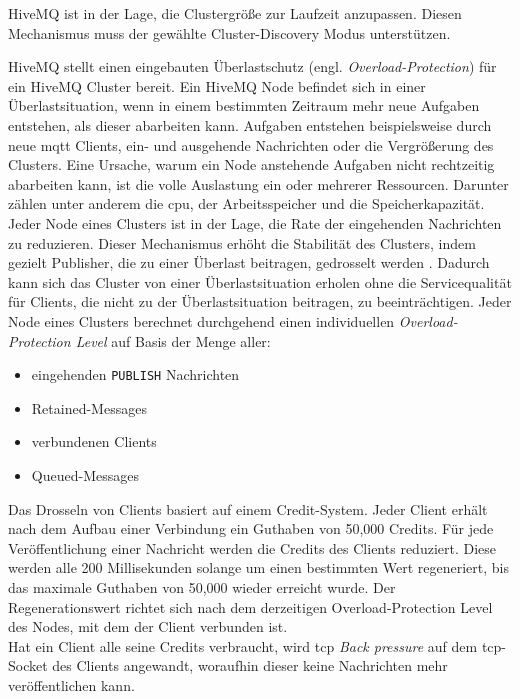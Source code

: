HiveMQ ist in der Lage, die Clustergrö{\ss}e zur Laufzeit anzupassen. Diesen Mechanismus muss der gewählte Cluster-Discovery Modus unterstützen.
\cite{HiveMQClusterHiveMQ}

 \label{sb:overload-protection}
HiveMQ stellt einen eingebauten Überlastschutz (engl. \textit{Overload-Protection}) für ein HiveMQ Cluster bereit.
Ein HiveMQ Node befindet sich in einer Überlastsituation, wenn in einem bestimmten Zeitraum mehr neue Aufgaben entstehen, als dieser abarbeiten kann. Aufgaben entstehen beispielsweise durch neue \ac{mqtt} Clients, ein- und ausgehende Nachrichten oder die Vergrö{\ss}erung des Clusters.
Eine Ursache, warum ein Node anstehende Aufgaben nicht rechtzeitig abarbeiten kann, ist die volle Auslastung ein oder mehrerer Ressourcen. Darunter zählen unter anderem die \ac{cpu}, der Arbeitsspeicher und die Speicherkapazität.
\\
Jeder Node eines Clusters ist in der Lage, die Rate der eingehenden Nachrichten zu reduzieren. Dieser Mechanismus erhöht die Stabilität des Clusters, indem gezielt Publisher, die zu einer Überlast beitragen, gedrosselt werden \cite{ClusterOverloadProtection}.
Dadurch kann sich das Cluster von einer Überlastsituation erholen ohne die Servicequalität für Clients, die nicht zu der Überlastsituation beitragen, zu beeinträchtigen.
Jeder Node eines Clusters berechnet durchgehend einen individuellen \textit{Overload-Protection Level} auf Basis der Menge aller:
\begin{itemize}
    \item eingehenden \verb|PUBLISH| Nachrichten
    \item Retained-Messages
    \item verbundenen Clients
    \item Queued-Messages
\end{itemize}
Das Drosseln von Clients basiert auf einem Credit-System. Jeder Client erhält nach dem Aufbau einer Verbindung ein Guthaben von 50,000 Credits.
Für jede Veröffentlichung einer Nachricht werden die Credits des Clients reduziert.
Diese werden alle 200 Millisekunden solange um einen bestimmten Wert regeneriert, bis das maximale Guthaben von 50,000 wieder erreicht wurde. Der Regenerationswert richtet sich nach dem derzeitigen Overload-Protection Level des Nodes, mit dem der Client verbunden ist.
\cite{ClusterOverloadProtection}
\\
Hat ein Client alle seine Credits verbraucht, wird \ac{tcp} \textit{Back pressure} auf dem \ac{tcp}-Socket des Clients angewandt, woraufhin dieser keine Nachrichten mehr veröffentlichen kann.
